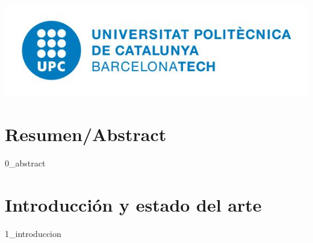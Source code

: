 \documentclass[13pt]{article}
\newcommand\blankpage{%
    \null
    \thispagestyle{empty}%
    \addtocounter{page}{-1}%
    \newpage}
\begin{document}
\begin{titlepage}



\includegraphics[scale=0.7]{logo_upc.png}\\[1cm] %
 

\vfill %
\afterpage{\blankpage}

\end{titlepage}

\section{Resumen/Abstract}
{0_abstract}
\newpage

\tableofcontents %

\newpage
\listoffigures
\newpage
\section{Introducción y estado del arte}
{1_introduccion}
\afterpage{\blankpage}
\end{document}
